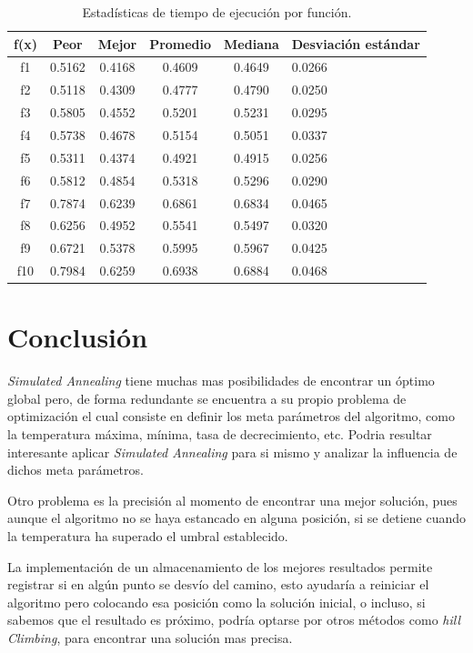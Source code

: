 \documentclass[12pt,twoside]{article}
\begin{document}
\begin{table}[h]
	\centering
	\begin{tabular}{|c|c|c|c|c|p{2.1cm}|}  
		\hline
		\textbf{f(x)} & \textbf{Peor} & \textbf{Mejor} & \textbf{Promedio} & \textbf{Mediana} & \textbf{Desviación estándar} \\  
		\hline
		f1  & 0.5162 & 0.4168 & 0.4609 & 0.4649 & 0.0266 \\
		f2  & 0.5118 & 0.4309 & 0.4777 & 0.4790 & 0.0250 \\
		f3  & 0.5805 & 0.4552 & 0.5201 & 0.5231 & 0.0295 \\
		f4  & 0.5738 & 0.4678 & 0.5154 & 0.5051 & 0.0337 \\
		f5  & 0.5311 & 0.4374 & 0.4921 & 0.4915 & 0.0256 \\
		f6  & 0.5812 & 0.4854 & 0.5318 & 0.5296 & 0.0290 \\
		f7  & 0.7874 & 0.6239 & 0.6861 & 0.6834 & 0.0465 \\
		f8  & 0.6256 & 0.4952 & 0.5541 & 0.5497 & 0.0320 \\
		f9  & 0.6721 & 0.5378 & 0.5995 & 0.5967 & 0.0425 \\
		f10 & 0.7984 & 0.6259 & 0.6938 & 0.6884 & 0.0468 \\
		\hline
	\end{tabular}
	\caption{Estadísticas de tiempo de ejecución por función.}
	\label{tab:tiempo}
\end{table}

\clearpage
\section{Conclusión}

\textit{Simulated Annealing} tiene muchas mas posibilidades de encontrar un óptimo global pero, de forma redundante se encuentra a su propio problema de optimización el cual consiste en definir los meta parámetros del algoritmo, como la temperatura máxima, mínima, tasa de decrecimiento, etc. Podria resultar interesante aplicar \textit{Simulated Annealing} para si mismo y analizar la influencia de dichos meta parámetros.

Otro problema es la precisión al momento de encontrar una mejor solución, pues aunque el algoritmo no se haya estancado en alguna posición, si se detiene cuando la temperatura ha superado el umbral establecido.

La implementación de un almacenamiento de los mejores resultados permite registrar si en algún punto se desvío del camino, esto ayudaría a reiniciar el algoritmo pero colocando esa posición como la solución inicial, o incluso, si sabemos que el resultado es próximo, podría optarse por otros métodos como \textit{hill Climbing}, para encontrar una solución mas precisa.
\end{document}
